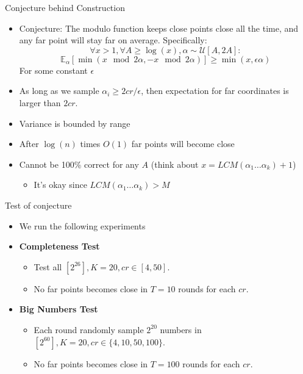 \documentclass[xcolor=svgnames]{beamer}
\newcommand{\E}{{\mathbb E}}
\begin{document}
\begin{frame}{Conjecture behind Construction}
\begin{itemize}
\item Conjecture: The modulo function keeps close points close all the time, and any far point will stay far on average. Specifically:
$$\forall x > 1, \forall A \geq \log(x), \alpha\sim\mathcal{U}[A,2A] : $$
$$\E_\alpha[\min(x \mod {2\alpha},-x \mod {2\alpha}) ] \geq \min(x,\epsilon\alpha)$$
For some constant $\epsilon$
\item As long as we sample $\alpha_i \geq 2cr/\epsilon$, then expectation for far coordinates is larger than $2cr$.
\item Variance is bounded by range
\item After $\log(n)$ times $O(1)$ far points will become close
\item Cannot be 100\% correct for any $A$ (think about $x=LCM(\alpha_1 \ldots \alpha_k) + 1$)
\begin{itemize}
\item It's okay since $LCM(\alpha_1 \ldots \alpha_k) > M$
\end{itemize}
\end{itemize}
\end{frame}

\begin{frame}{Test of conjecture}
\begin{itemize}
\item We run the following experiments
\item \textbf{Completeness Test}
\begin{itemize}
\item Test all $[2^{26}], K=20, cr \in [4, 50]$.
\item No far points becomes close in $T=10$ rounds for each $cr$.
\end{itemize}
\item \textbf{Big Numbers Test}
\begin{itemize}
\item Each round randomly sample $2^{20}$ numbers in $[2^{60}], K=20, cr \in \{4, 10, 50, 100\}$.
\item No far points becomes close in $T=100$ rounds for each $cr$.
\end{itemize}
\end{itemize}
\end{frame}
\end{document}
